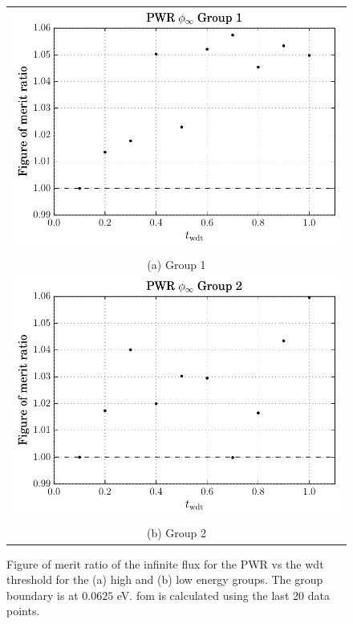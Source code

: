 \begin{figure}[hbtp]
  \centering
  \begin{tabular}{c}
  \includegraphics[scale=0.9]{images/results/pwr_inf_flx_grp_1} \\
    (a) Group 1\\
  \includegraphics[scale=0.9]{images/results/pwr_inf_flx_grp_2} \\
    (b) Group 2
  \end{tabular}
  \caption[Figure of merit ratio of the infinite flux for the
  PWR]{Figure of merit ratio of the infinite flux for the PWR vs the
    \gls{wdt} threshold for the (a) high and (b) low energy
    groups. The group boundary is at $0.0625$ eV. \gls{fom} is
    calculated using the last 20 data points.}
  \label{fig:pwr_inf_flx}
\end{figure}

